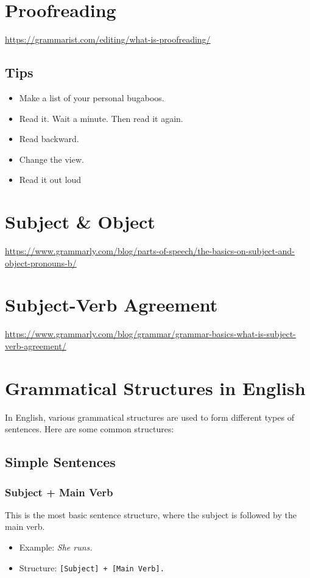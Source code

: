 \documentclass{book}
\begin{document}
\chapter{Proofreading}

\url{https://grammarist.com/editing/what-is-proofreading/}

\section{Tips}

\begin{itemize}
	\item Make a list of your personal bugaboos.
	\item Read it. Wait a minute. Then read it again.
	\item Read backward.
	\item Change the view.
	\item Read it out loud
\end{itemize}

\chapter{Subject \& Object}

\url{https://www.grammarly.com/blog/parts-of-speech/the-basics-on-subject-and-object-pronouns-b/}

\chapter{Subject-Verb Agreement}

\url{https://www.grammarly.com/blog/grammar/grammar-basics-what-is-subject-verb-agreement/}

\chapter{Grammatical Structures in English}

In English, various grammatical structures are used to form different types of sentences. Here are some common structures:

\section{Simple Sentences}

\subsection{Subject + Main Verb}
This is the most basic sentence structure, where the subject is followed by the main verb.
\begin{itemize}
	\item Example: \textit{She runs.}
	\item Structure: \texttt{[Subject] + [Main Verb].}
\end{itemize}
\end{document}
